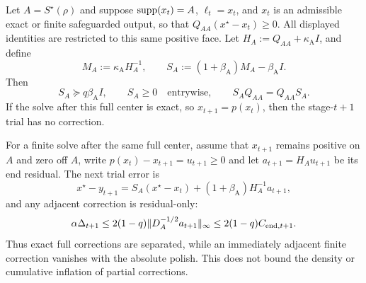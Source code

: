 \begin{lemma}
\label{lem:aesp-cd-full-correction-separation}
Let $A=S^\star(\rho)$ and suppose $\operatorname{supp}(x_t)=A$, $\ell_t=x_t$, and
$x_t$ is an admissible exact or finite safeguarded output, so that
$Q_{AA}(x^\star-x_t)\geq0$.  All displayed identities are restricted to
this same positive face.  Let
$H_A:=Q_{AA}+\kappa_{\mathrm A}I$, and define
\begin{equation}
 M_A:=\kappa_{\mathrm A}H_A^{-1},
 \qquad
 S_A:=(1+\beta_{\mathrm A})M_A-\beta_{\mathrm A}I.
 \label{eq:aesp-cd-full-correction-maps}
\end{equation}
Then
\begin{equation}
 S_A\succeq q\beta_{\mathrm A}I,
 \qquad S_A\geq0\quad\text{entrywise},
 \qquad S_AQ_{AA}=Q_{AA}S_A.
 \label{eq:aesp-cd-full-correction-positive-map}
\end{equation}
If the solve after this full center is exact, so
$x_{t+1}=p(x_t)$, then the stage-$t+1$ trial has no correction.

For a finite solve after the same full center, assume that $x_{t+1}$ remains
positive on $A$ and zero off $A$, write
$p(x_t)-x_{t+1}=u_{t+1}\geq0$ and let
$a_{t+1}=H_Au_{t+1}$ be its end residual.  The next trial error is
\begin{equation}
 x^\star-y_{t+1}
 =S_A(x^\star-x_t)+(1+\beta_{\mathrm A})H_A^{-1}a_{t+1},
 \label{eq:aesp-cd-finite-after-full-trial}
\end{equation}
and any adjacent correction is residual-only:
\begin{equation}
 \alpha\Delta_{t+1}
 \leq2(1-q)
 \lVert D_A^{-1/2}a_{t+1}\rVert_\infty
 \leq2(1-q)C_{\mathrm{end},t+1}.
 \label{eq:aesp-cd-finite-after-full-bound}
\end{equation}
Thus exact full corrections are separated, while an immediately adjacent
finite correction vanishes with the absolute polish.  This does not bound
the density or cumulative inflation of partial corrections.
\end{lemma}

